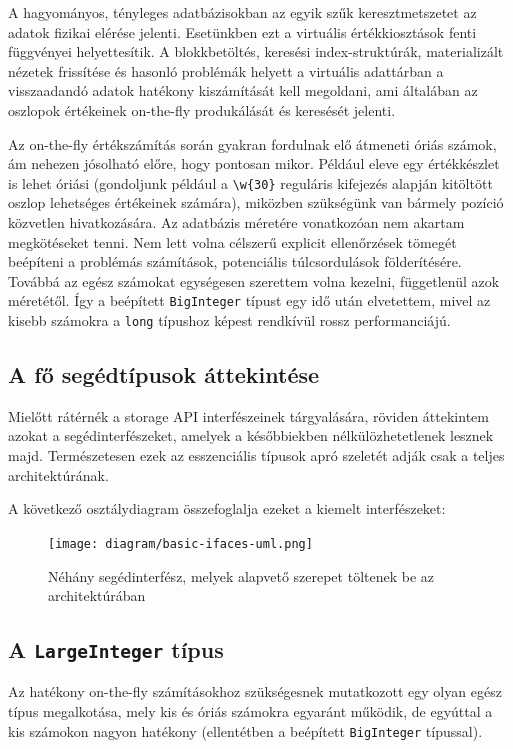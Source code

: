 \documentclass[
    parspace,
    noindent,
    nohyp,
]{elteiktdk}[2023/04/10]
\newcommand{\regextt}[1]{\texttt{\colorbox{verylightgray}{#1}}}
\begin{document}
A hagyományos, tényleges adatbázisokban az egyik szűk keresztmetszetet
az adatok fizikai elérése jelenti.
Esetünkben ezt a virtuális értékkiosztások fenti függvényei helyettesítik.
A blokkbetöltés, keresési index-struktúrák, materializált nézetek frissítése
és hasonló problémák helyett a virtuális adattárban
a visszaadandó adatok hatékony kiszámítását kell megoldani,
ami általában az oszlopok értékeinek on-the-fly produkálását és keresését jelenti.

Az on-the-fly értékszámítás során gyakran fordulnak elő átmeneti óriás számok,
ám nehezen jósolható előre, hogy pontosan mikor.
Például eleve egy értékkészlet is lehet óriási
(gondoljunk például a \regextt{{\textbackslash}w\{30\}}
reguláris kifejezés alapján kitöltött oszlop lehetséges értékeinek számára),
miközben szükségünk van bármely pozíció közvetlen hivatkozására.
Az adatbázis méretére vonatkozóan nem akartam megkötéseket tenni.
Nem lett volna célszerű explicit ellenőrzések tömegét beépíteni
a problémás számítások, potenciális túlcsordulások földerítésére.
Továbbá az egész számokat egységesen szerettem volna kezelni, függetlenül azok méretétől.
Így a beépített \texttt{BigInteger} típust egy idő után elvetettem,
mivel az kisebb számokra a \texttt{long} típushoz képest rendkívül rossz performanciájú.

\subsection{A fő segédtípusok áttekintése}

Mielőtt rátérnék a storage API interfészeinek tárgyalására,
röviden áttekintem azokat a segédinterfészeket,
amelyek a későbbiekben nélkülözhetetlenek lesznek majd.
Természetesen ezek az esszenciális típusok apró szeletét adják csak a teljes architektúrának.

A következő osztálydiagram összefoglalja ezeket a kiemelt interfészeket:

\begin{figure}[H]
\centering
\texttt{[image: diagram/basic-ifaces-uml.png]}
\caption[Alapvető segédinterfészek]{
    Néhány segédinterfész, melyek alapvető szerepet töltenek be az architektúrában
}
\end{figure}

\subsection{A \texttt{LargeInteger} típus}

Az hatékony on-the-fly számításokhoz
szükségesnek mutatkozott egy olyan egész típus megalkotása,
mely kis és óriás számokra egyaránt működik,
de egyúttal a kis számokon nagyon hatékony (ellentétben a beépített \texttt{BigInteger} típussal).
\end{document}
